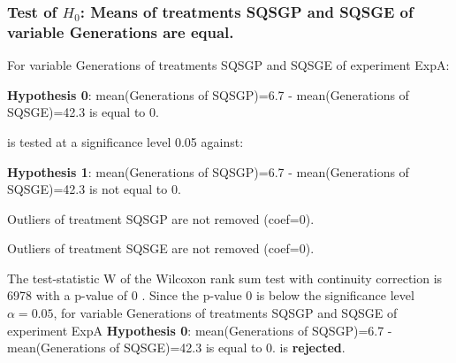 \begin{frame}[t]
 \frametitle{Test of $H_{0}$: Means of treatments SQSGP and SQSGE of variable Generations are equal. }
 \scriptsize
 For variable Generations of treatments SQSGP and SQSGE of experiment ExpA:

\vspace{1mm}
{\bf Hypothesis 0}: mean(Generations of SQSGP)=6.7 - mean(Generations of SQSGE)=42.3 is equal to 0.


 \begin{center} is tested at a significance level 0.05 against: \end{center}

{\bf Hypothesis 1}: mean(Generations of SQSGP)=6.7 - mean(Generations of SQSGE)=42.3 is not equal to 0.
\vspace{1mm}
\vspace{1mm}

 Outliers of treatment SQSGP  are not removed (coef=0).

 Outliers of treatment SQSGE  are not removed (coef=0).
\vspace{1mm}
 
 The test-statistic W of the Wilcoxon rank sum test with continuity correction is 6978 with a p-value of 0 .
 Since the p-value 0 is below the significance level $\alpha= 0.05 $,
 for variable Generations of treatments SQSGP and SQSGE of experiment ExpA 
 {\bf Hypothesis 0}: mean(Generations of SQSGP)=6.7 - mean(Generations of SQSGE)=42.3 is equal to 0.
is {\bf rejected}.

 \end{frame}
